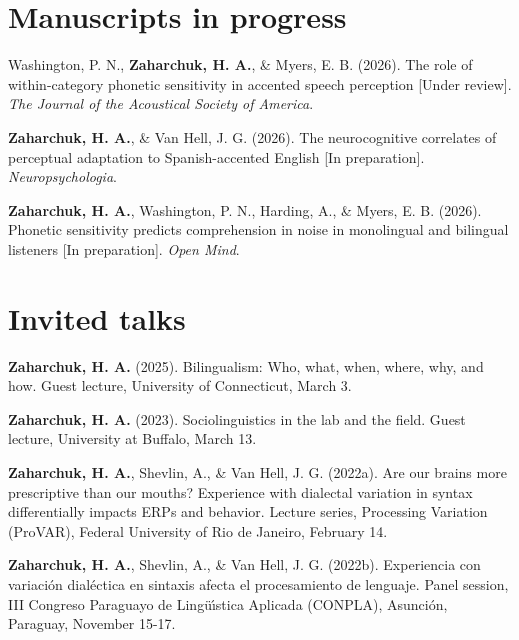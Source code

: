 \documentclass[11pt,a4paper,]{awesome-cv}
\newlength{\cslhangindent}
\newenvironment{CSLReferences}[2] %
 {\begin{list}{}{%
  \setlength{\itemindent}{0pt}
  \setlength{\leftmargin}{0pt}
  \setlength{\parsep}{0pt}
  \ifodd #1
   \setlength{\leftmargin}{\cslhangindent}
   \setlength{\itemindent}{-1\cslhangindent}
  \fi
  \setlength{\itemsep}{#2\baselineskip}}}
 {\end{list}}
\begin{document}
\section{Manuscripts in progress}\label{manuscripts-in-progress}

\label{refs-27e76f9df57632119f25d465e94ae168}
\begin{CSLReferences}{1}{0}
Washington, P. N., \textbf{\textbf{Zaharchuk, H.} A.}, \& Myers, E. B. (2026). The role of
within-category phonetic sensitivity in accented speech perception
{[}Under review{]}. \emph{The Journal of the Acoustical Society of
America}.

\textbf{\textbf{Zaharchuk, H.} A.}, \& Van Hell, J. G. (2026). The neurocognitive
correlates of perceptual adaptation to Spanish-accented English {[}In
preparation{]}. \emph{Neuropsychologia}.

\textbf{\textbf{Zaharchuk, H.} A.}, Washington, P. N., Harding, A., \& Myers, E. B.
(2026). Phonetic sensitivity predicts comprehension in noise in
monolingual and bilingual listeners {[}In preparation{]}. \emph{Open
Mind}.

\end{CSLReferences}

\section{Invited talks}\label{invited-talks}

\label{refs-06ac7968e1e72a7b73a6c28c3943c4dd}
\begin{CSLReferences}{1}{0}
\textbf{\textbf{Zaharchuk, H.} A.} (2025). Bilingualism: Who, what, when, where, why, and
how. Guest lecture, University of Connecticut, March 3.

\textbf{\textbf{Zaharchuk, H.} A.} (2023). Sociolinguistics in the lab and the field.
Guest lecture, University at Buffalo, March 13.

\textbf{\textbf{Zaharchuk, H.} A.}, Shevlin, A., \& Van Hell, J. G. (2022a). Are our
brains more prescriptive than our mouths? Experience with dialectal
variation in syntax differentially impacts ERPs and behavior. Lecture
series, Processing Variation (ProVAR), Federal University of Rio de
Janeiro, February 14.

\textbf{\textbf{Zaharchuk, H.} A.}, Shevlin, A., \& Van Hell, J. G. (2022b). Experiencia
con variación dialéctica en sintaxis afecta el procesamiento de
lenguaje. Panel session, III Congreso Paraguayo de Lingüı́stica Aplicada
(CONPLA), Asunción, Paraguay, November 15-17.

\end{CSLReferences}
\end{document}
